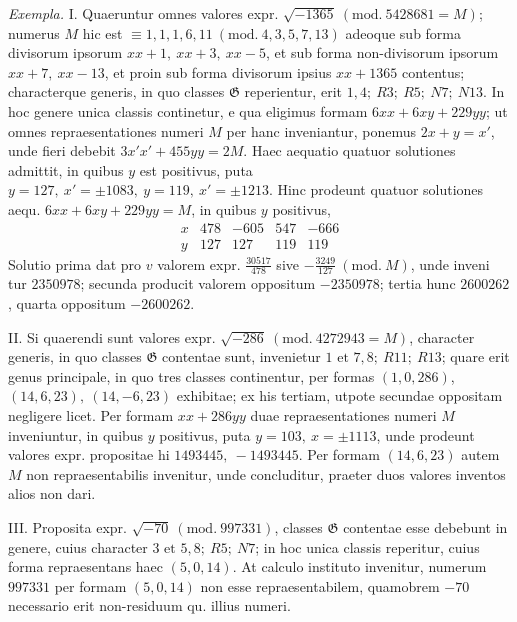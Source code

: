 \textit{Exempla.} I. Quaeruntur omnes valores expr. \(\surd{-1365}\ (\mathrm{mod.}\ 5428681=M)\); numerus \(M\) hic est \(\equiv1,\allowbreak 1,\allowbreak 1,\allowbreak 6,\allowbreak 11\ (\mathrm{mod.}\ 4,\allowbreak 3,\allowbreak 5,\allowbreak 7,\allowbreak 13)\) adeoque sub forma divisorum ipsorum \(xx+1,\allowbreak \ xx+3,\allowbreak \ xx-5\), et sub forma non-divisorum ipsorum \(xx+7,\allowbreak \ xx-13\), et proin sub forma divisorum ipsius \(xx+1365\) contentus; characterque generis, in quo classes \(\mathfrak G\) reperientur, erit \(1,\allowbreak 4;\allowbreak \ R3;\allowbreak \ R5;\allowbreak \ N7;\allowbreak \ N13\). In hoc genere unica classis continetur, e qua eligimus formam \(6xx+6xy+229yy\); ut omnes repraesentationes numeri \(M\) per hanc inveniantur, ponemus \(2x+y=x'\), unde fieri debebit \(3x'x'+455yy=2M\). Haec aequatio quatuor solutiones admittit, in quibus \(y\) est positivus, puta \(y=127,\allowbreak \ x'=\pm1083,\allowbreak \ y=119,\allowbreak \ x'=\pm1213\). Hinc prodeunt quatuor solutiones aequ. \(6xx+6xy+229yy=M\), in quibus \(y\) positivus, \[\renewcommand{\arraystretch}{1.25}\begin{array}{c|r|r|r|r}x&478&-605&547&-666\\y&127&127&119&119\end{array}\] Solutio prima dat pro \(v\) valorem expr. \(\frac{30517}{478}\) sive \(-\frac{3249}{127}\ (\mathrm{mod.}\ M)\), unde inveni%
tur \(2350978\); secunda producit valorem oppositum \(-2350978\); tertia hunc \(2600262\), quarta oppositum \(-2600262\).

II. Si quaerendi sunt valores expr. \(\surd{-286}\ (\mathrm{mod.}\ 4272943=M)\), character generis, in quo classes \(\mathfrak G\) contentae sunt, invenietur \(1\text{ et }7,\allowbreak 8;\allowbreak \ R11;\allowbreak \ R13\); quare erit genus principale, in quo tres classes continentur, per formas \((1,\allowbreak 0,\allowbreak 286)\), \((14,\allowbreak 6,\allowbreak 23),\allowbreak \ (14,\allowbreak -6,\allowbreak 23)\) exhibitae; ex his tertiam, utpote secundae oppositam negligere licet. Per formam \(xx+286yy\) duae repraesentationes numeri \(M\) inveniuntur, in quibus \(y\) positivus, puta \(y=103,\allowbreak \ x=\pm1113\), unde prodeunt valores expr. propositae hi \(1493445,\allowbreak \ -1493445\). Per formam \((14,\allowbreak 6,\allowbreak 23)\) autem \(M\) non repraesentabilis invenitur, unde concluditur, praeter duos valores inventos alios non dari.

III. Proposita expr. \(\surd{-70}\ (\mathrm{mod.}\ 997331)\), classes \(\mathfrak G\) contentae esse debebunt in genere, cuius character \(3\text{ et }5,\allowbreak 8;\allowbreak \ R5;\allowbreak \ N7\); in hoc unica classis reperitur, cuius forma repraesentans haec \((5,\allowbreak 0,\allowbreak 14)\). At calculo instituto invenitur, numerum \(997331\) per formam \((5,\allowbreak 0,\allowbreak 14)\) non esse repraesentabilem, quamobrem \(-70\) necessario erit non-residuum qu. illius numeri.

